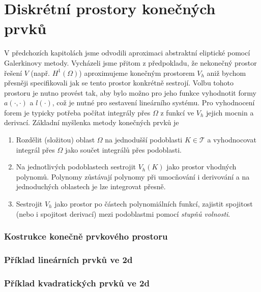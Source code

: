 \section{Diskrétní prostory konečných prvků}
V předchozích kapitolách jsme odvodili aproximaci abstraktní eliptické pomocí Galerkinovy metody.
Vycházeli jsme přitom z předpokladu, že nekonečný prostor řešení $V$ (např. $H^1(\Omega)$) aproximujeme
konečným prostorem $V_h$ aniž bychom přesněji specifikovali jak se tento prostor konkrétně sestrojí.
Volbu tohoto prostoru je nutno provést tak, aby bylo možno pro jeho funkce vyhodnotit formy $a(\cdot, \cdot)$
a $l(\cdot)$, což je nutné pro sestavení lineárního systému. Pro vyhodnocení forem je typicky potřeba 
počítat integrály přes $\Omega$ z funkcí ve $V_h$ jejich mocnin a derivací. Základní myšlenka metody konečných prvků je
\begin{enumerate}
 \item Rozdělit (složitou) oblast $\Omega$ na jednodušší podoblasti $K\in \mathcal T$ a vyhodnocovat integrál přes 
 $\Omega$ jako součet integrálů přes podoblasti.
 \item Na jednotlivých podoblastech sestrojit $V_h(K)$ jako prostor vhodných polynomů. Polynomy zůstávají polynomy 
 při umocňování i derivování a na jednoduchých oblastech je lze integrovat přesně.
 \item Sestrojit $V_h$ jako prostor po částech polynomiálních funkcí, zajistit spojitost (nebo i spojitost derivací) mezi podoblastmi 
 pomocí {\it stupňů volnosti}.
\end{enumerate}

\subsubsection{Kostrukce konečně prvkového prostoru}

\subsubsection{Příklad lineárních prvků ve 2d}

\subsubsection{Příklad kvadratických prvků ve 2d}

